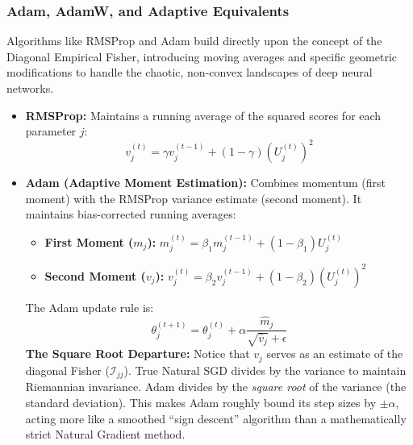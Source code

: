 \documentclass[
  letterpaper,
  DIV=11,
  numbers=noendperiod]{scrreprt}
\providecommand{\tightlist}{%
  \setlength{\itemsep}{0pt}\setlength{\parskip}{0pt}}
\renewcommand{\[}{\begin{equation}}
\renewcommand{\]}{\end{equation}}
\theoremstyle{definition}
\theoremstyle{plain}
\theoremstyle{plain}
\theoremstyle{plain}
\theoremstyle{definition}
\theoremstyle{plain}
\theoremstyle{remark}
\begin{document}
\subsubsection{Adam, AdamW, and Adaptive
Equivalents}\label{adam-adamw-and-adaptive-equivalents}

Algorithms like RMSProp and Adam build directly upon the concept of the
Diagonal Empirical Fisher, introducing moving averages and specific
geometric modifications to handle the chaotic, non-convex landscapes of
deep neural networks.

\begin{itemize}
\item
  \textbf{RMSProp:} Maintains a running average of the squared scores
  for each parameter \(j\): \[
    v_j^{(t)} = \gamma v_j^{(t-1)} + (1-\gamma) (U_j^{(t)})^2
    \]
\item
  \textbf{Adam (Adaptive Moment Estimation):} Combines momentum (first
  moment) with the RMSProp variance estimate (second moment). It
  maintains bias-corrected running averages:

  \begin{itemize}
  \tightlist
  \item
    \textbf{First Moment (\(m_j\)):}
    \(m_j^{(t)} = \beta_1 m_j^{(t-1)} + (1 - \beta_1) U_j^{(t)}\)
  \item
    \textbf{Second Moment (\(v_j\)):}
    \(v_j^{(t)} = \beta_2 v_j^{(t-1)} + (1 - \beta_2) (U_j^{(t)})^2\)
  \end{itemize}

  The Adam update rule is: \[
    \theta_j^{(t+1)} = \theta_j^{(t)} + \alpha \frac{\hat{m}_j}{\sqrt{\hat{v}_j} + \epsilon}
    \] \textbf{The Square Root Departure:} Notice that \(v_j\) serves as
  an estimate of the diagonal Fisher (\(\mathcal{I}_{jj}\)). True
  Natural SGD divides by the variance to maintain Riemannian invariance.
  Adam divides by the \emph{square root} of the variance (the standard
  deviation). This makes Adam roughly bound its step sizes by
  \(\pm \alpha\), acting more like a smoothed ``sign descent'' algorithm
  than a mathematically strict Natural Gradient method.
\end{itemize}
\end{document}

